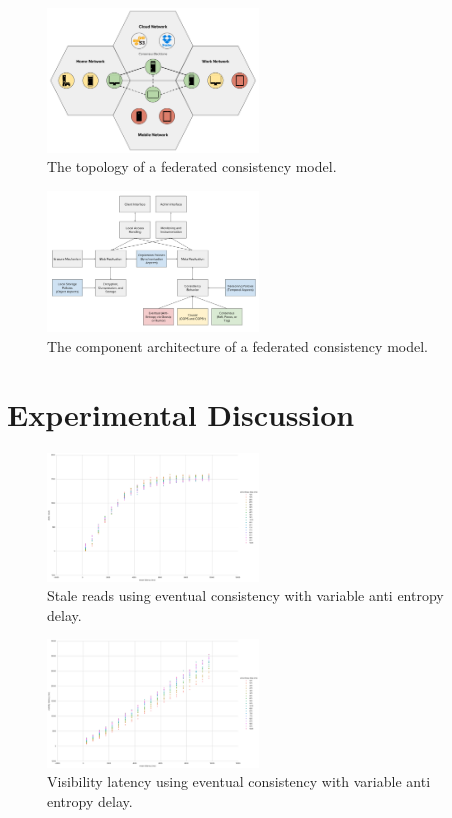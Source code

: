 \documentclass[letterpaper,twocolumn,10pt]{article}
\begin{document}
\begin{figure}[h]
    \centering
    \includegraphics[width=0.5\textwidth]{figures/topology}
    \caption{The topology of a federated consistency model.}
\end{figure}

\begin{figure}[h]
    \centering
    \includegraphics[width=0.5\textwidth]{figures/architecture}
    \caption{The component architecture of a federated consistency model.}
\end{figure}

\section{Experimental Discussion}

\begin{figure}[h]
    \centering
    \includegraphics[width=0.5\textwidth]{figures/ae_stale_reads}
    \caption{Stale reads using eventual consistency with variable anti entropy delay.}
\end{figure}

\begin{figure}[h]
    \centering
    \includegraphics[width=0.5\textwidth]{figures/ae_viz_latency}
    \caption{Visibility latency using eventual consistency with variable anti entropy delay.}
\end{figure}
\end{document}
